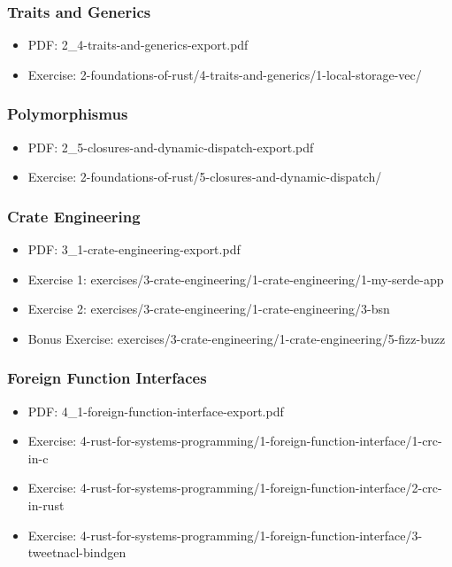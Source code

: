 \documentclass{beamer}
\begin{document}
\begin{frame}
	\frametitle{Traits and Generics}
	\begin{itemize}
		\item PDF: 2\_4-traits-and-generics-export.pdf
		\item Exercise: 2-foundations-of-rust/4-traits-and-generics/1-local-storage-vec/
	\end{itemize}
\end{frame}

\begin{frame}
	\frametitle{Polymorphismus}
	\begin{itemize}
		\item PDF: 2\_5-closures-and-dynamic-dispatch-export.pdf
		\item Exercise: 2-foundations-of-rust/5-closures-and-dynamic-dispatch/
	\end{itemize}
\end{frame}

\begin{frame}
	\frametitle{Crate Engineering}
	\begin{itemize}
		\item PDF: 3\_1-crate-engineering-export.pdf
		\item Exercise 1: exercises/3-crate-engineering/1-crate-engineering/1-my-serde-app
		\item Exercise 2: exercises/3-crate-engineering/1-crate-engineering/3-bsn
		\item Bonus Exercise: exercises/3-crate-engineering/1-crate-engineering/5-fizz-buzz
	\end{itemize}
\end{frame}

\begin{frame}
	\frametitle{Foreign Function Interfaces}
	\begin{itemize}
		\item PDF: 4\_1-foreign-function-interface-export.pdf
		\item Exercise: 4-rust-for-systems-programming/1-foreign-function-interface/1-crc-in-c
		\item Exercise: 4-rust-for-systems-programming/1-foreign-function-interface/2-crc-in-rust
		\item Exercise: 4-rust-for-systems-programming/1-foreign-function-interface/3-tweetnacl-bindgen
	\end{itemize}
\end{frame}
\end{document}
